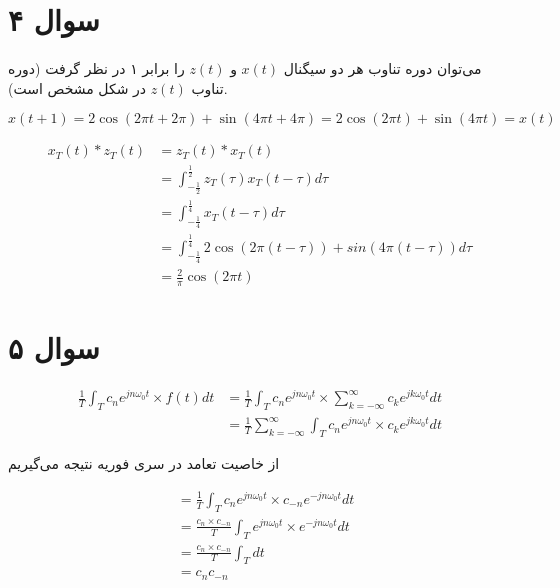 \documentclass{article}
\begin{document}
	\section*{سوال ۴}
	\paragraph*{}
	می‌توان دوره تناوب هر دو سیگنال
	$x(t)$
	و
	$z(t)$
	را برابر ۱ در نظر گرفت (دوره تناوب $z(t)$ در شکل مشخص است).

	\begin{equation*}
		x(t+1) = 2\cos(2\pi t + 2\pi) + \sin(4\pi t + 4\pi)
		= 2\cos(2\pi t) + \sin(4\pi t) = x(t)
	\end{equation*}

	\begin{align*}
		x_T(t) * z_T(t) &= z_T(t) * x_T(t) \\
		&= \int_{-\frac{1}{2}}^{\frac{1}{2}} z_T(\tau)x_T(t-\tau) d\tau \\
		&= \int_{-\frac{1}{4}}^{\frac{1}{4}} x_T(t-\tau) d\tau \\
		&= \int_{-\frac{1}{4}}^{\frac{1}{4}} 2\cos(2\pi (t-\tau)) + sin(4\pi (t- \tau)) d\tau \\
		&= \frac{2}{\pi} \cos(2\pi t)
	\end{align*}

	\section*{سوال ۵}

	\begin{align*}
		\frac{1}{T} \int_{T}^{} c_n e^{jn\omega_0t} \times f(t) dt
		&= \frac{1}{T} \int_{T}^{} c_n e^{jn\omega_0t} \times
		\sum_{k=-\infty}^{\infty} c_k e^{jk\omega_0t} dt \\
		&= \frac{1}{T} \sum_{k=-\infty}^{\infty} \int_{T}^{} c_n e^{jn\omega_0t} \times c_k e^{jk\omega_0t} dt
	\end{align*}

	از خاصیت تعامد در سری فوریه نتیجه می‌گیریم

	\begin{align*}
		&= \frac{1}{T} \int_{T}^{} c_n e^{jn\omega_0t} \times c_{-n} e^{-jn\omega_0t} dt \\
		&= \frac{c_n \times c_{-n}}{T} \int_{T}^{} e^{jn\omega_0t} \times e^{-jn\omega_0t} dt \\
		&= \frac{c_n \times c_{-n}}{T} \int_{T}^{} dt \\
		&= c_nc_{-n} \\
	\end{align*}
\end{document}
